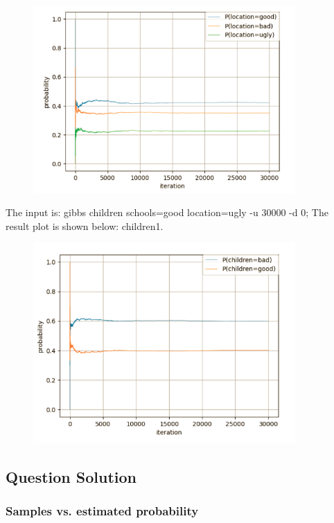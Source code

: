 \documentclass[11pt, a4paper]{article}
\begin{document}
\begin{figure}[htbp]
	
	\centering 
	\includegraphics[width=10cm]{gs_2}
	
	\label{fig:gb2}
	
\end{figure}

The input is: gibbs children schools=good location=ugly -u 30000 -d 0; The result plot is shown below: children1.

\begin{figure}[htbp]
	
	\centering 
	\includegraphics[width=10cm]{gs_3}
	
	\label{fig:gb3}
	
\end{figure}


\subsection{Question Solution}

\subsubsection{Samples vs. estimated probability}
\end{document}

